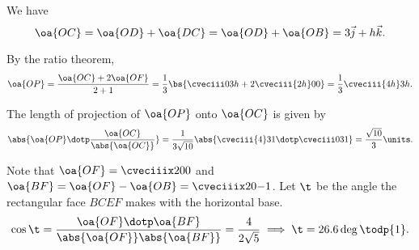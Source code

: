 \begin{solution}
    \begin{ppart}
        We have \[\oa{OC} = \oa{OD} + \oa{DC} = \oa{OD} + \oa{OB} = 3 \vec j + h \vec k.\]
    \end{ppart}
    \begin{ppart}
        By the ratio theorem, \[\oa{OP} = \frac{\oa{OC} + 2 \oa{OF}}{2 + 1} = \frac13 \bs{\cveciii03h + 2\cveciii{2h}00 } = \frac13 \cveciii{4h}3h.\]
    \end{ppart}
    \begin{ppart}
        The length of projection of $\oa{OP}$ onto $\oa{OC}$ is given by \[\abs{\oa{OP} \dotp \frac{\oa{OC}}{\abs{\oa{OC}}}} = \frac1{3\sqrt{10}} \abs{\cveciii{4}31 \dotp \cveciii031} = \frac{\sqrt{10}}3 \units.\]
    \end{ppart}
    \begin{ppart}
        Note that $\oa{OF} = \cveciiix200$ and $\oa{BF} = \oa{OF} - \oa{OB} = \cveciiix20{-1}$. Let $\t$ be the angle the rectangular face $BCEF$ makes with the horizontal base. \[\cos \t = \frac{\oa{OF} \dotp \oa{BF}}{\abs{\oa{OF}}\abs{\oa{BF}}} = \frac{4}{2\sqrt5} \implies \t = 26.6 \deg \todp{1}.\]
    \end{ppart}
\end{solution}

